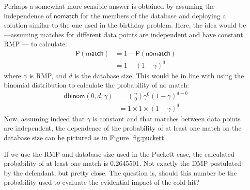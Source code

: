 \documentclass[
  10pt,
  dvipsnames,enabledeprecatedfontcommands]{scrartcl}
\newcommand{\pr}[1]{\mathsf{P}(#1)}
\begin{document}
Perhaps a somewhat more sensible answer is obtained by assuming the
independence of \(\mathsf{no match}\) for the members of the database
and deploying a solution similar to the one used in the birthday
problem. Here, the idea would be---assuming matches for different data
points are independent and have constant RMP --- to calculate:
\begin{align*}
\pr{\mathsf{match}} & = 1 - \pr{\mathsf{no match}}\\
& = 1 - (1-\gamma)^d
\end{align*} \noindent where \(\gamma\) is RMP, and \(d\) is the
database size. This would be in line with using the binomial
distribution to calculate the probability of no match: \begin{align*}
\mathsf{dbinom}(0,d,\gamma) & = {n \choose 0} \gamma^0 (1-\gamma)^{d-0}\\
& = 1 \times 1 \times (1-\gamma)^d
\end{align*} Now, assuming indeed that \(\gamma\) is constant and that
matches between data points are independent, the dependence of the
probability of at least one match on the database size can be pictured
as in Figure \ref{fig:puckett}.

If we use the RMP and database size used in the Puckett case, the
calculated probability of at least one match is 0.2645501. Not exactly
the DMP postulated by the defendant, but pretty close. The question is,
should this number be the probability used to evaluate the evidential
impact of the cold hit?
\end{document}
